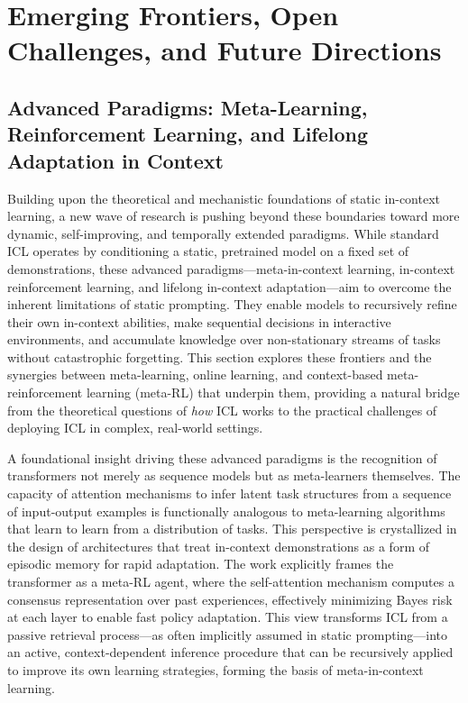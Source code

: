 \documentclass[11pt]{article}
\begin{document}
\section{Emerging Frontiers, Open Challenges, and Future Directions}

\subsection{Advanced Paradigms: Meta-Learning, Reinforcement Learning, and Lifelong Adaptation in Context}

Building upon the theoretical and mechanistic foundations of static in-context learning, a new wave of research is pushing beyond these boundaries toward more dynamic, self-improving, and temporally extended paradigms. While standard ICL operates by conditioning a static, pretrained model on a fixed set of demonstrations, these advanced paradigms---meta-in-context learning, in-context reinforcement learning, and lifelong in-context adaptation---aim to overcome the inherent limitations of static prompting. They enable models to recursively refine their own in-context abilities, make sequential decisions in interactive environments, and accumulate knowledge over non-stationary streams of tasks without catastrophic forgetting. This section explores these frontiers and the synergies between meta-learning, online learning, and context-based meta-reinforcement learning (meta-RL) that underpin them, providing a natural bridge from the theoretical questions of \emph{how} ICL works to the practical challenges of deploying ICL in complex, real-world settings.

A foundational insight driving these advanced paradigms is the recognition of transformers not merely as sequence models but as meta-learners themselves. The capacity of attention mechanisms to infer latent task structures from a sequence of input-output examples is functionally analogous to meta-learning algorithms that learn to learn from a distribution of tasks. This perspective is crystallized in the design of architectures that treat in-context demonstrations as a form of episodic memory for rapid adaptation. The work \cite{ref363} explicitly frames the transformer as a meta-RL agent, where the self-attention mechanism computes a consensus representation over past experiences, effectively minimizing Bayes risk at each layer to enable fast policy adaptation. This view transforms ICL from a passive retrieval process---as often implicitly assumed in static prompting---into an active, context-dependent inference procedure that can be recursively applied to improve its own learning strategies, forming the basis of meta-in-context learning.
\end{document}

